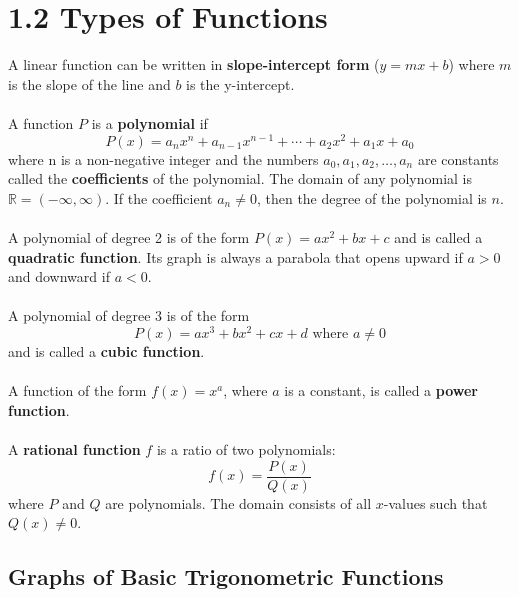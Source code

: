 %
%

\section*{1.2 Types of Functions}

A linear function can be written in \textbf{slope-intercept form} (\(y=mx+b\)) where \(m\) is the slope of the line and \(b\) is the y-intercept.
\\\\
A function \(P\) is a \textbf{polynomial} if 
$$P(x)=a_n{x}^n+a_{n-1}x^{n-1}+ \cdots +a_2x^2+a_1x+a_0$$
where n is a non-negative integer and the numbers \(a_0, a_1, a_2, \ldots ,a_n\) are constants called the \textbf{coefficients} of the polynomial. The domain of any polynomial is \(\mathbb{R} = (-\infty, \infty)\). If the coefficient \(a_n \neq 0\), then the degree of the polynomial is \(n\).
\\\\
A polynomial of degree 2 is of the form \(P(x)=ax^2+bx+c\) and is called a \textbf{quadratic function}. Its graph is always a parabola that opens upward if \(a > 0\) and downward if \(a < 0\).
\\\\
A polynomial of degree 3 is of the form 
\[ P(x)=ax^3+bx^2+cx+d \text{ where } a \neq 0 \]
and is called a \textbf{cubic function}.
\\\\
A function of the form \(f(x) = x^a\), where \(a\) is a constant, is called a \textbf{power function}.
\\\\
A \textbf{rational function} \(f\) is a ratio of two polynomials:
\[ f(x)=\frac{P(x)}{Q(x)} \]
where \(P\) and \(Q\) are polynomials. The domain consists of all \(x\)-values such that \( Q(x) \neq 0 \).

\subsection*{Graphs of Basic Trigonometric Functions}

